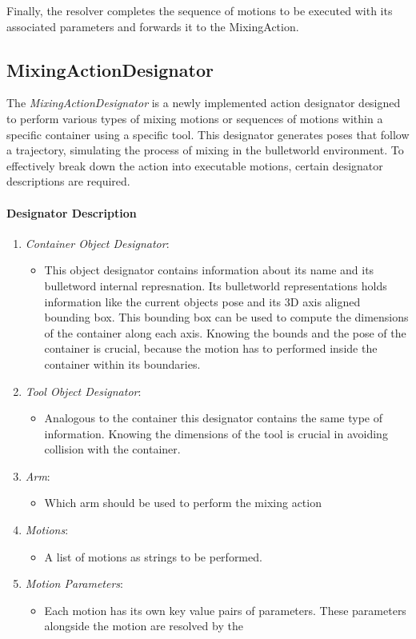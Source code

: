 Finally, the resolver completes the sequence of motions to be executed with its associated parameters and 
forwards it to the MixingAction.

\subsection{MixingActionDesignator}
The \textit{MixingActionDesignator} is a newly implemented action designator 
designed to perform various types of mixing motions or sequences of motions within a specific container using a specific tool. 
This designator generates poses that follow a trajectory, simulating the process of mixing in the bulletworld environment.
To effectively break down the action into executable motions, certain designator descriptions are required.


\paragraph{Designator Description}
\begin{enumerate}
    \item \textit{Container Object Designator}:
    \begin{itemize}
        \item This object designator contains information about its name and its bulletword internal represnation.
            Its bulletworld representations holds information like the current objects pose and its 3D axis aligned bounding box.
            This bounding box can be used to compute the dimensions of the container along each axis. 
            Knowing the bounds and the pose of the container is crucial, because the motion has to performed inside 
            the container within its boundaries.
    \end{itemize}
    \item \textit{Tool Object Designator}:
    \begin{itemize}
        \item Analogous to the container this designator contains the same type of information.
        Knowing the dimensions of the tool is crucial in avoiding collision with the container.
    \end{itemize}
    \item \textit{Arm}:
    \begin{itemize}
        \item Which arm should be used to perform the mixing action
    \end{itemize}
    \item \textit{Motions}:
    \begin{itemize}
        \item A list of motions as strings to be performed. 
    \end{itemize}
    \item \textit{Motion Parameters}:
    \begin{itemize}
        \item Each motion has its own key value pairs of parameters.
        These parameters alongside the motion are resolved by the 
    \end{itemize}
\end{enumerate}

